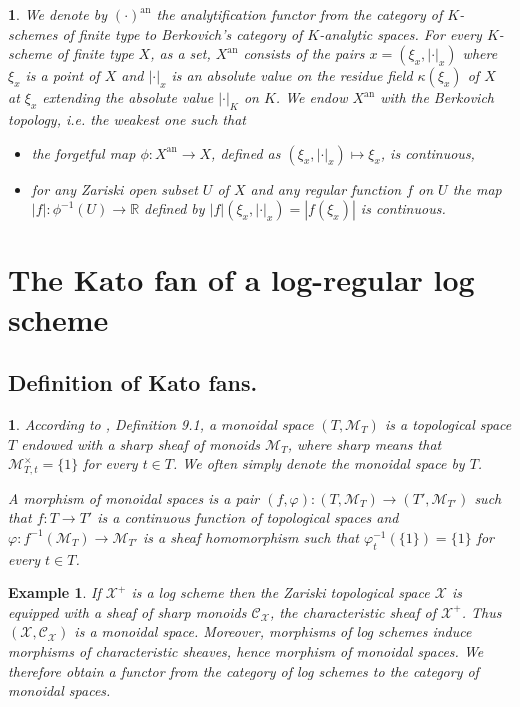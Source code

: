 \documentclass{amsart}%
\numberwithin{equation}{subsection}
\theoremstyle{plain2}
\theoremstyle{definition2}
\newtheorem{example}[equation]{Example}
\theoremstyle{stepstyle}
\theoremstyle{point}
\theoremstyle{subpoint}
\newtheorem{subpoint}[equation]{}%
\newcommand{\spa}[1]{\begin{subpoint}#1\end{subpoint}}           %
\newcommand{\R}{\ensuremath{\mathbb{R}}}
\newcommand{\cX}{\ensuremath{\mathscr{X}}}
\newcommand{\caM}{\ensuremath{\mathcal{M}}}
\newcommand{\caC}{\ensuremath{\mathcal{C}}}
\renewcommand{\R}{\ensuremath{\mathbb{R}}}
\newcommand{\an}{\mathrm{an}}
\begin{document}
\spa{We denote by $(\cdot)^{\an}$ the analytification functor from the category of $K$-schemes of finite type to Berkovich's category of $K$-analytic spaces. For every $K$-scheme of finite type $X$, as a set, $X^{\an}$ consists of the pairs $x=(\xi_x,|\cdot|_x)$ where $\xi_x$ is a point of $X$ and $|\cdot|_x$ is an absolute value on the residue field $\kappa(\xi_x)$ of $X$ at $\xi_x$ extending the absolute value $|\cdot|_K$ on $K$. We endow $X^{\an}$ with the Berkovich topology, i.e. the weakest one such that \begin{itemize}
\item[(i)] the forgetful map $\phi: X^{\an} \rightarrow X$, defined as $(\xi_x,|\cdot|_x) \mapsto \xi_x$, is continuous,
\item[(ii)] for any Zariski open subset $U$ of $X$ and any regular function $f$ on $U$ the map $|f|:\phi^{-1}(U) \rightarrow \R$ defined by $|f|(\xi_x,|\cdot|_x)=|f(\xi_x)|$ is continuous. 
\end{itemize}}

\section{The Kato fan of a log-regular log scheme} \label{sect kato fan}

\subsection{Definition of Kato fans.}
\spa{ According to \cite{Kato1994a}, Definition 9.1, a monoidal space $(T, \caM_T)$ is a topological space $T$ endowed with a sharp sheaf of monoids $\caM_T$, where \textit{sharp} means that $\caM_{T,t}^\times = \{1\}$ for every $t \in T$. We often simply denote the monoidal space by $T$.

A morphism of monoidal spaces is a pair $(f,\varphi):(T,\caM_T) \rightarrow (T',\caM_{T'})$  such that $f:T \rightarrow T'$ is a continuous function of topological spaces and $\varphi: f^{-1}(\caM_T) \rightarrow \caM_{T'}$ is a sheaf homomorphism such that $\varphi_{t}^{-1}(\{1\})=\{1\}$ for every $t \in T$.}

\begin{example}
If $\cX^+$ is a log scheme then the Zariski topological space $\cX$ is equipped with a sheaf of sharp monoids $\caC_{\cX}$, the characteristic sheaf of $\cX^+$. Thus $(\cX,\caC_{\cX})$ is a monoidal space. Moreover, morphisms of log schemes
induce morphisms of characteristic sheaves, hence morphism of monoidal spaces. We therefore obtain a functor from the category of log schemes to the category of monoidal spaces.
\end{example}
\end{document}

